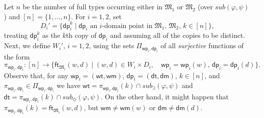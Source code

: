 \documentclass{lmcs} %
\theoremstyle{plain}\newtheorem{satz}[thm]{Satz} %
\newcommand{\sub}{\textit{sub}}
\newcommand{\wt}{\mathsf{wt}}
\newcommand{\dt}{\mathsf{dt}}
\newcommand{\ft}{\mathsf{ft}}
\newcommand{\wm}{\mathsf{wm}}
\newcommand{\dm}{\mathsf{dm}}
\newcommand{\iwp}{\mathsf{wp}_i}
\newcommand{\idp}{\mathsf{dp}_i}
\begin{document}
%

Let $n$ be the number of full types occurring either in $\mathfrak M_1$ or $\mathfrak M_2$ (over $\sub(\varphi, \psi)$) and $[n] = \{1,\dots,n\}$. For $i = 1,2$, set 
%
\begin{equation*}
D_{i}' = \{ \idp^k \mid \idp \text{ an $i$-domain point in $\mathfrak{M}_{1}$, $\mathfrak{M}_{2}$, $k \in [n]$} \},
\end{equation*}
%
treating $\idp^k$ as the $k$th copy of $\idp$ and assuming all of the copies to be distinct. 
Next, we define $W_{i}'$, $i=1,2$, using the sets $\Pi_{\iwp,\idp}$ of all \emph{surjective} functions of the form
%
$$
\pi_{\iwp,\idp} \colon [n] \to \{ \ft_{\mathfrak{M}_{i}}(w,d) \mid \text{$(w,d)\in W_{i} \times D_{i}$},\quad \text{$\iwp=\iwp(w)$, $\idp = \idp(d)$}\}.
$$
%
Observe that, for any $\iwp = (\wt,\wm)$, $\idp = (\dt,\dm)$, $k\in [n]$, and
$\pi_{\iwp,\idp}\in \Pi_{\iwp,\idp}$ we have $\wt = \pi_{\iwp,\idp}(k) \cap \sub_\exists(\varphi,\psi)$ and $\dt =  \pi_{\iwp,\idp}(k) \cap \sub_\Diamond (\varphi,\psi)$. On the other hand, it might happen that $\pi_{\iwp,\idp}(k) = \ft_{\mathfrak{M}_{i}}(w,d)$,
but $\wm\ne \wm(w)$ or $\dm\ne\dm(d)$.  
%
\end{document}
